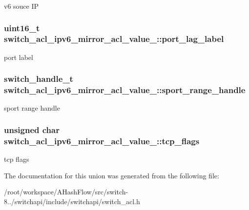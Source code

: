 v6 souce I\+P \hypertarget{unionswitch__acl__ipv6__mirror__acl__value___a4a8d2887d81e205416a316b7920a0c33}{
\subsubsection[{port\+\_\+lag\+\_\+label}]{\setlength{\rightskip}{0pt plus 5cm}uint16\+\_\+t switch\+\_\+acl\+\_\+ipv6\+\_\+mirror\+\_\+acl\+\_\+value\+\_\+\+::port\+\_\+lag\+\_\+label}}\label{unionswitch__acl__ipv6__mirror__acl__value___a4a8d2887d81e205416a316b7920a0c33}
port label \hypertarget{unionswitch__acl__ipv6__mirror__acl__value___af42bddfd4521dee70f84d394cc62b1c5}{
\subsubsection[{sport\+\_\+range\+\_\+handle}]{\setlength{\rightskip}{0pt plus 5cm}switch\+\_\+handle\+\_\+t switch\+\_\+acl\+\_\+ipv6\+\_\+mirror\+\_\+acl\+\_\+value\+\_\+\+::sport\+\_\+range\+\_\+handle}}\label{unionswitch__acl__ipv6__mirror__acl__value___af42bddfd4521dee70f84d394cc62b1c5}
sport range handle \hypertarget{unionswitch__acl__ipv6__mirror__acl__value___acdae9390c4170ad1af05a822d7e3184e}{
\subsubsection[{tcp\+\_\+flags}]{\setlength{\rightskip}{0pt plus 5cm}unsigned char switch\+\_\+acl\+\_\+ipv6\+\_\+mirror\+\_\+acl\+\_\+value\+\_\+\+::tcp\+\_\+flags}}\label{unionswitch__acl__ipv6__mirror__acl__value___acdae9390c4170ad1af05a822d7e3184e}
tcp flags 

The documentation for this union was generated from the following file\+:\begin{DoxyCompactItemize}
\item 
/root/workspace/\+A\+Hash\+Flow/src/switch-\/8../switchapi/include/switchapi/switch\+\_\+acl.\+h\end{DoxyCompactItemize}
